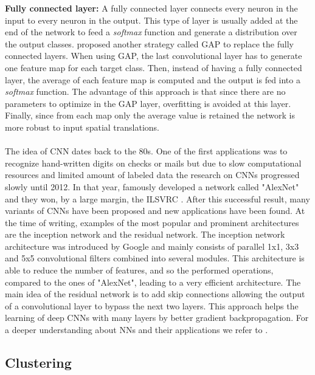 \textbf{Fully connected layer:} A fully connected layer connects every neuron in the input to every neuron in the output. This type of layer is usually added at the end of the network to feed a \textit{softmax} function and generate a distribution over the output classes. \textcite{lin_network_2013} proposed another strategy called \acf{GAP} to replace the fully connected layers. When using \acs{GAP}, the last convolutional layer has to generate one feature map for each target class. Then, instead of having a fully connected layer, the average of each feature map is computed and the output is fed into a \textit{softmax} function. The advantage of this approach is that since there are no parameters to optimize in the \acs{GAP} layer, overfitting is avoided at this layer. Finally, since from each map only the average value is retained the network is more robust to input spatial translations.\\ \\
The idea of \acs{CNN} \cite{lecun_backpropagation_1989, fukushima_neocognitron:_1980} dates back to the 80s. One of the first applications was to recognize hand-written digits on checks or mails but due to slow computational resources and limited amount of labeled data the research on \acsp{CNN} progressed slowly until 2012. In that year, \textcite{krizhevsky_imagenet_2012} famously developed a network called "AlexNet" and they won, by a large margin, the \acf{ILSVRC} \cite{russakovsky_imagenet_2015}. After this successful result, many variants of \acsp{CNN} have been proposed and new applications have been found. At the time of writing, examples of the most popular and prominent architectures are the inception network and the residual network. The inception network architecture \cite{szegedy_rethinking_2016} was introduced by Google and mainly consists of parallel 1x1, 3x3 and 5x5 convolutional filters combined into several modules. This architecture is able to reduce the number of features, and so the performed operations, compared to the ones of "AlexNet", leading to a very efficient architecture. The main idea of the residual network \cite{he_deep_2016} is to add skip connections allowing the output of a convolutional layer to bypass the next two layers. This approach helps the learning of deep \acsp{CNN} with many layers by better gradient backpropagation. For a deeper understanding about \aclp{NN} and their applications we refer to \cite{goodfellow_deep_2016}.

\subsection{Clustering}

